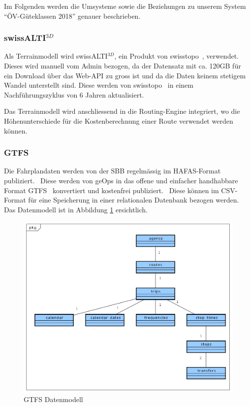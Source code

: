 Im Folgenden werden die Umsysteme sowie die Beziehungen zu unserem System "`ÖV-Güteklassen 2018"' genauer beschrieben.

\subsubsection{swissALTI$^{3D}$}
\label{subsystem:swissALTI3D}

Als \gls{Terrainmodell} wird swissALTI$^{3D}$, ein Produkt von swisstopo~\cite{swissalti3d_swisstopo}, verwendet.
Dieses wird manuell vom Admin bezogen, da der Datensatz mit ca. 120GB für ein Download über das Web-\ac{API} zu gross ist und da die Daten keinem stetigem Wandel unterstellt sind.
Diese werden von swisstopo~\cite{swissalti3d_swisstopo} in einem Nachführungszyklus von 6 Jahren aktualisiert.

Das \gls{Terrainmodell} wird anschliessend in die Routing-Engine integriert, wo die Höhenunterschiede für die Kostenberechnung einer Route verwendet werden können.

\subsubsection{GTFS}
\label{subsystem:GTFS}

Die Fahrplandaten werden von der SBB regelmässig im HAFAS-Format publiziert.~\cite{sbb_hafas_spec}
Diese werden von geOps in das offene und einfacher handhabbare Format \ac{GTFS}~\cite{gtfs_spec} konvertiert und kostenfrei publiziert.~\cite{geops_fahrplandaten}
Diese können im CSV-Format für eine Speicherung in einer relationalen Datenbank bezogen werden.
Das Datenmodell ist in Abbildung \ref{fig:GTFS_data_model} ersichtlich.

\begin{figure}[ht]
    \centering
    \includegraphics[width=1.0\linewidth]{projectdoc/img/GTFS_data_model}
    \caption[GTFS Datenmodell]{GTFS Datenmodell}
    \label{fig:GTFS_data_model}
\end{figure}


